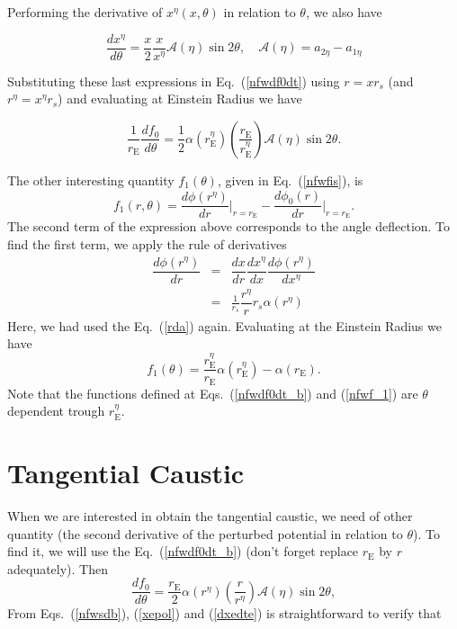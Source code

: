 \documentclass[a4paper,twoside]{article}
\def \rs {r_s}
\def \ma {\mathcal{A}}
\def \re {r_{\mathrm{E}}}
\def \ren{r^\eta_{\mathrm{E}}}
\def \ret {r^\eta}
\def \po {\phi_0}
\def \al {\alpha}
\def \te {\theta}
\def \ae {a_{1\eta}}
\def \be {a_{2\eta}}
\def \xe {x^\eta}
\def \ree {r^\eta_{\mathrm{E}}}
\begin{document}
Performing the derivative of $\xe(x,\te)$ in relation to $\te$, we also have

\begin{equation}
\dfrac{d\xe}{d\te}=\frac{x}{2}\frac{x}{\xe}\ma(\eta)\sin{2\te}, \quad \ma(\eta)= \be-\ae
\label{dxedte}
\end{equation}

Substituting these last expressions in  Eq.~(\ref{nfwdf0dt}) using $r=x\rs$ (and $r^\eta=\xe\rs$) and evaluating at Einstein Radius we have

\begin{equation}
\frac{1}{\re}\dfrac{d f_0}{d\te}=\frac{1}{2}\al(\ree)\left(\dfrac{\re}{\ree}\right)\ma(\eta)\sin{2\te}.
\label{nfwdf0dt_b}
\end{equation}

The other interesting quantity $f_1(\te)$, given in Eq.~(\ref{nfwfis}), is
\begin{equation*}
f_1(r,\te)=\dfrac{d\phi(\ret)}{dr}{\Big|_{r=\re}}-\dfrac{d\po(r)}{dr}{\Big|_{r=\re}}.
\end{equation*}
The second term of the expression above corresponds to the angle deflection. To find the first term, we apply the rule of derivatives
\begin{eqnarray}
\dfrac{d\phi(\ret)}{dr}&=&\dfrac{dx}{dr}\dfrac{d\xe}{dx}\dfrac{d\phi(\ret)}{d\xe} \nonumber \\
                      &=&\frac{1}{\rs}\dfrac{\ret}{r}\rs\al(r^\eta)
\end{eqnarray}
Here, we had used the Eq.~(\ref{rda}) again. Evaluating at the Einstein Radius we have
\begin{equation}
f_1(\te)=\dfrac{\ren}{\re}\al(\ren)-\al(\re).
\label{nfwf_1}
\end{equation}
Note that the functions defined at Eqs.~(\ref{nfwdf0dt_b}) and (\ref{nfwf_1}) are $\te$ dependent trough $\ren$.

\section{\label{sec_caust} Tangential Caustic}

When we are interested in obtain the tangential caustic, we need of other quantity (the second derivative of the perturbed potential in relation to $\te$). To find it, we will use the Eq.~(\ref{nfwdf0dt_b}) (don't forget replace $\re$ by $r$ adequately). Then
\begin{equation}
\dfrac{d f_0}{d\te}=\frac{\re}{2}\al(r^\eta)\left(\dfrac{r}{r^\eta}\right)\ma(\eta)\sin{2\te},
\label{nfwdf0dt_c}
\end{equation}
From Eqs.~(\ref{nfwsdb}), (\ref{xepol}) and (\ref{dxedte}) is straightforward to verify that
\end{document}
